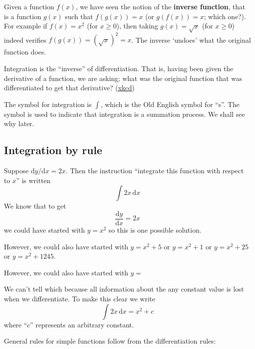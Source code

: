 \documentclass[
  english,
  11pt,
  oneside]{book}
\newcommand{\slide}{}
\theoremstyle{definition}
\theoremstyle{definition}
\theoremstyle{definition}
\theoremstyle{definition}
\theoremstyle{remark}
\begin{document}
Given a function \(f(x)\), we have seen the notion of the \textbf{inverse function}, that is a function \(g(x)\) such that \(f(g(x)) = x\) (or \(g(f(x))=x\); which one?). For example if \(f(x) = x^2\) (for \(x\geq0\)), then taking \(g(x) = \sqrt{x}\) (for \(x\geq0\)) indeed verifies \(f(g(x)) = (\sqrt{x})^2 = x\). The inverse `undoes' what the original function does.

Integration is the ``inverse'' of differentiation. That is, having been given the derivative of a function, we are asking; what was the original function that was differentiated to get that derivative? (\href{https://xkcd.com/2117/}{xkcd})

The symbol for integration is \(\displaystyle\int\), which is the Old English symbol for ``s''. The symbol is used to indicate that integration is a summation process. We shall see why later.

\slide

\subsection{Integration by rule}\label{integration-by-rule}

Suppose \(\mathrm{d}y/\mathrm{d} x = 2x\). Then the instruction ``integrate this function with respect to \(x\)'' is written
\[
\int 2x \,\mathrm{d}x
\]
We know that to get
\[
\frac{\mathrm{d}y}{\mathrm{d}x} = 2x
\]
we could have started with \(y = x^2\) so this is one possible solution.

\begin{notslides}

However, we could also have started with \(y = x^2 + 5\) or \(y = x^2 + 1\) or \(y = x^2 + 25\) or \(y = x^2 + 1245\).

\end{notslides}

\begin{slidesonly}

However, we could also have started with \(y =\)
\slide

\end{slidesonly}

We can't tell which because all information about the any constant value is lost when we differentiate. To make this clear we write
\[
\int 2x \,\mathrm{d}x = x^2 + c
\]
where ``\(c\)'' represents an arbitrary constant.

\slide

General rules for simple functions follow from the differentiation rules:
\end{document}
